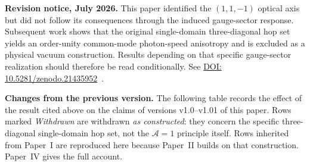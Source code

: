 %
%

\medskip
\noindent\textbf{Revision notice, July 2026.}  This paper identified
the $(1, 1, -1)$ optical axis but did not follow its consequences
through the induced gauge-sector response.  Subsequent work shows
that the original single-domain three-diagonal hop set yields an
order-unity common-mode photon-speed anisotropy and is excluded as a
physical vacuum construction.  Results depending on that specific
gauge-sector realization should therefore be read conditionally.  See
\href{https://doi.org/10.5281/zenodo.21435952}%
{DOI: 10.5281/zenodo.21435952}~\cite{menendez2026opticalaxis}.

\newpage

\noindent\textbf{Changes from the previous version.}  The following
table records the effect of the result cited above on the claims of
versions v1.0--v1.01 of this paper.  Rows marked \emph{Withdrawn} are
withdrawn \emph{as constructed}: they concern the specific
three-diagonal single-domain hop set, not the $\mathcal{A}=1$
principle itself.  Rows inherited from Paper~I are reproduced here
because Paper~II builds on that construction.  Paper~IV gives the
full account.

